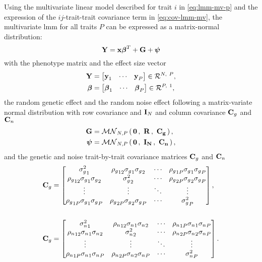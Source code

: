 Using the multivariate linear model described for trait \(i\) in \cref{eq:lmm-mv-p} and the expression of the \(ij\)-trait-trait covariance term in \cref{eq:cov-lmm-mv}, the multivariate \gls{lmm} for all traits \(P\) can be expressed as a matrix-normal distribution:
%
\begin{equation}
\boldsymbol{\mathbf{Y}} = \boldsymbol{\mathbf{x}}\boldsymbol{\mathbf{\beta}}^T + \boldsymbol{\mathbf{G}} + \boldsymbol{\mathbf{\psi}}
\label{eq:lmm-mv}
\end{equation}
%
with the phenotype matrix  and the effect size vector \tmat{\beta}
%
\begin{align}
 \mat{Y} &=
  \begin{bmatrix} 
 	\mat{y}_{1} & \cdots & \mat{y}_{P} 
 \end{bmatrix} \inR N P,\\
%
 \mat{\beta} &=
  \begin{bmatrix} 
 	\mat{\beta}_{1} & \cdots & \mat{\beta}_{P} 
 \end{bmatrix} \inR P 1,\\
 \end{align}
the random genetic effect  and the random noise effect \tmat{\psi} following a matrix-variate normal distribution with row covariance  and \(\boldsymbol{\mathbf{I}}_N\) and column covariance \(\boldsymbol{\mathbf{C}}_g\) and  \(\boldsymbol{\mathbf{C}}_n\)
\begin{align}
 \mat{G} &= \matrixnormal N P 0 {\mat{R}}{\mat{C}_g},\\
%
 \mat{\psi} &= \matrixnormal N P 0 {\mat{I}_N}{\mat{C}_n},
 \end{align}
%
and the genetic and noise trait-by-trait covariance matrices \(\boldsymbol{\mathbf{C}}_g\) and  \(\boldsymbol{\mathbf{C}}_n\) 
%
 \begin{align}
 \mat{C}_g &=
  \begin{bmatrix}
  {\sigma_g^2}_1 &  {\rho_g}_{12} {\sigma_g}_1 {\sigma_g}_2 & \cdots & {\rho_g}_{1P} {\sigma_g}_1 {\sigma_g}_P \\
  {\rho_g}_{12} {\sigma_g}_1 {\sigma_g}_2 & {\sigma_g^2}_2 & \cdots & {\rho_g}_{2P} {\sigma_g}_2 {\sigma_g}_P \\
   \vdots & \vdots & \ddots & \vdots \\
   {\rho_g}_{1P} {\sigma_g}_1 {\sigma_g}_P  &  {\rho_g}_{2P} {\sigma_g}_2 {\sigma_g}_P  & \cdots &{\sigma_g^2}_P 
   \end{bmatrix}, \\ \\
 \mat{C}_g &=
  \begin{bmatrix}
  {\sigma_n^2}_1 &  {\rho_n}_{12} {\sigma_n}_1 {\sigma_n}_2 & \cdots & {\rho_n}_{1P} {\sigma_n}_1 {\sigma_n}_P \\
  {\rho_n}_{12} {\sigma_n}_1 {\sigma_n}_2 & {\sigma_n^2}_2 & \cdots & {\rho_n}_{2P} {\sigma_n}_2 {\sigma_n}_P \\
   \vdots & \vdots & \ddots & \vdots \\
   {\rho_n}_{1P} {\sigma_n}_1 {\sigma_n}_P  &  {\rho_n}_{2P} {\sigma_n}_2 {\sigma_n}_P  & \cdots &{\sigma_n^2}_P 
   \end{bmatrix}.
%
\end{align}
